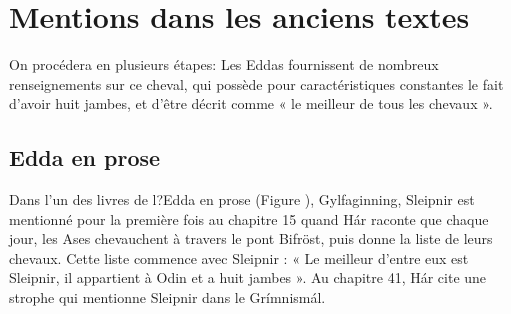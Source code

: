\documentclass[a4paper, 12pt]{article}
\begin{document}
\section{Mentions dans les anciens textes}
On procédera en plusieurs étapes: Les Eddas fournissent de nombreux
renseignements sur ce cheval, qui possède pour caractéristiques
constantes le fait d'avoir huit jambes, et d'être décrit comme « le
meilleur de tous les chevaux ».

\subsection{Edda en prose}
Dans l'un des livres de l?Edda en prose (Figure ),
Gylfaginning, Sleipnir est mentionné pour la première fois au chapitre
15 quand Hár raconte que chaque jour, les Ases chevauchent à travers
le pont Bifröst, puis donne la liste de leurs chevaux. Cette liste
commence avec Sleipnir : « Le meilleur d'entre eux est Sleipnir, il
appartient à Odin et a huit jambes ». Au chapitre 41, Hár cite une
strophe qui mentionne Sleipnir dans le Grímnismál.
\end{document}
